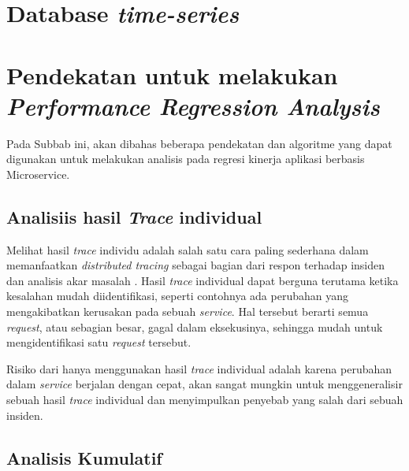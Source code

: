 \section{Database \textit{time-series}}

\section{Pendekatan untuk melakukan \textit{Performance Regression Analysis}}
Pada Subbab ini, akan dibahas beberapa pendekatan dan algoritme yang dapat digunakan untuk melakukan analisis pada regresi kinerja aplikasi berbasis Microservice.
\label{ch2-algo}


\subsection{Analisiis hasil \textit{Trace} individual}
Melihat hasil \textit{trace} individu adalah salah satu cara paling sederhana dalam memanfaatkan \textit{distributed tracing} sebagai bagian dari respon terhadap insiden dan analisis akar masalah \citep{parker2020distributed}. Hasil \textit{trace} individual dapat berguna terutama ketika kesalahan mudah diidentifikasi, seperti contohnya ada perubahan yang mengakibatkan kerusakan pada sebuah \textit{service}. Hal tersebut berarti semua \textit{request}, atau sebagian besar, gagal dalam eksekusinya, sehingga mudah untuk mengidentifikasi satu \textit{request} tersebut.

Risiko dari hanya menggunakan hasil \textit{trace} individual adalah karena perubahan dalam \textit{service} berjalan dengan cepat, akan sangat mungkin untuk menggeneralisir sebuah hasil \textit{trace} individual dan menyimpulkan penyebab yang salah dari sebuah insiden. 






\subsection{Analisis Kumulatif}
\label{approach-cumulative}

